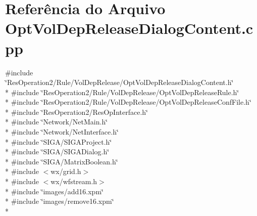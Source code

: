 \section{Referência do Arquivo Opt\+Vol\+Dep\+Release\+Dialog\+Content.\+cpp}
\label{_opt_vol_dep_release_dialog_content_8cpp}
{\ttfamily \#include \char`\"{}Res\+Operation2/\+Rule/\+Vol\+Dep\+Release/\+Opt\+Vol\+Dep\+Release\+Dialog\+Content.\+h\char`\"{}}\\*
{\ttfamily \#include \char`\"{}Res\+Operation2/\+Rule/\+Vol\+Dep\+Release/\+Opt\+Vol\+Dep\+Release\+Rule.\+h\char`\"{}}\\*
{\ttfamily \#include \char`\"{}Res\+Operation2/\+Rule/\+Vol\+Dep\+Release/\+Opt\+Vol\+Dep\+Release\+Conf\+File.\+h\char`\"{}}\\*
{\ttfamily \#include \char`\"{}Res\+Operation2/\+Res\+Op\+Interface.\+h\char`\"{}}\\*
{\ttfamily \#include \char`\"{}Network/\+Net\+Main.\+h\char`\"{}}\\*
{\ttfamily \#include \char`\"{}Network/\+Net\+Interface.\+h\char`\"{}}\\*
{\ttfamily \#include \char`\"{}S\+I\+G\+A/\+S\+I\+G\+A\+Project.\+h\char`\"{}}\\*
{\ttfamily \#include \char`\"{}S\+I\+G\+A/\+S\+I\+G\+A\+Dialog.\+h\char`\"{}}\\*
{\ttfamily \#include \char`\"{}S\+I\+G\+A/\+Matrix\+Boolean.\+h\char`\"{}}\\*
{\ttfamily \#include $<$wx/grid.\+h$>$}\\*
{\ttfamily \#include $<$wx/wfstream.\+h$>$}\\*
{\ttfamily \#include \char`\"{}images/add16.\+xpm\char`\"{}}\\*
{\ttfamily \#include \char`\"{}images/remove16.\+xpm\char`\"{}}\\*
